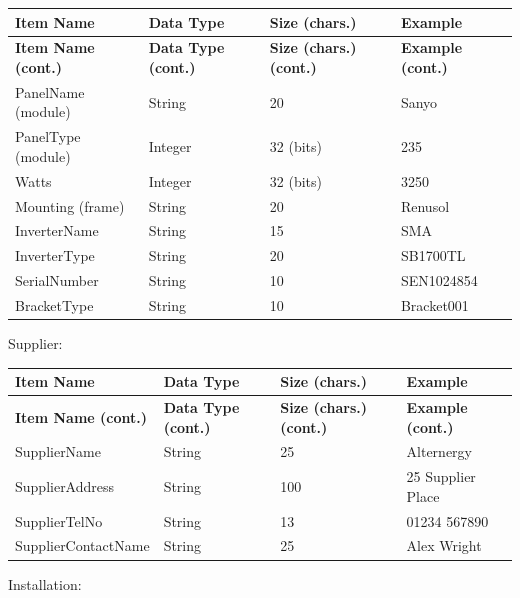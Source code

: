 \begin{center}
	\begin{longtable}{ | p{4cm} | p{4cm} | p{4cm} | p{4cm} | }
		\hline
		\textbf{Item Name} & \textbf{Data Type} & \textbf{Size
(chars.)} & \textbf{Example}\\
		\endfirsthead
		\hline
		\textbf{Item Name (cont.)} & \textbf{Data Type (cont.)} &
\textbf{Size (chars.) (cont.)} & \textbf{Example (cont.)}\\
		\endhead
		\hline
		PanelName (module) & String & 20 & Sanyo\\
		\hline
		PanelType (module) & Integer & 32 (bits) & 235\\
		\hline
		Watts & Integer & 32 (bits) & 3250\\
		\hline
		Mounting (frame) & String & 20 & Renusol \\
		\hline
		InverterName & String & 15 & SMA\\
		\hline
		InverterType & String & 20 & SB1700TL\\
		\hline
		SerialNumber & String & 10 & SEN1024854\\
		\hline
		BracketType & String & 10 & Bracket001\\
		\hline
	\end{longtable}
\end{center}

Supplier:

\begin{center}
	\begin{longtable}{ | p{4cm} | p{4cm} | p{4cm} | p{4cm} | }
		\hline
		\textbf{Item Name} & \textbf{Data Type} & \textbf{Size
(chars.)} & \textbf{Example}\\
		\endfirsthead
		\hline
		\textbf{Item Name (cont.)} & \textbf{Data Type (cont.)} &
\textbf{Size (chars.) (cont.)} & \textbf{Example (cont.)}\\
		\endhead
		\hline
		SupplierName & String & 25 & Alternergy\\
		\hline
		SupplierAddress & String & 100 & 25 Supplier Place\\
		\hline
		SupplierTelNo & String & 13 & 01234 567890\\
		\hline
		SupplierContactName & String & 25 & Alex Wright\\
		\hline
	\end{longtable}
\end{center}

Installation:

